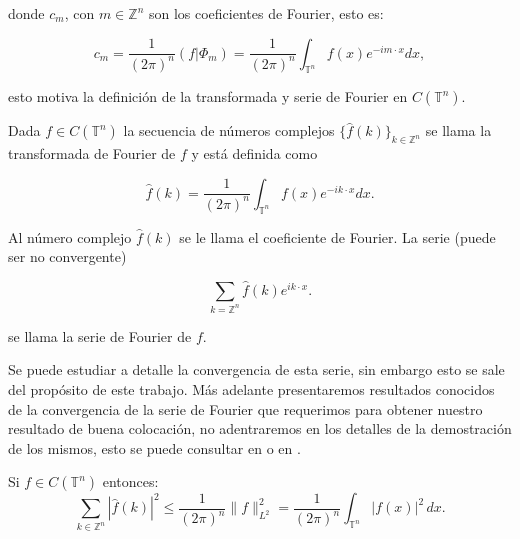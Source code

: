 \documentclass[12pt]{article}
\newcommand\Z{\ensuremath{\mathbb{Z}}}
\newcommand\T{\mathbb{T}}
\begin{document}
donde $c_m$, con $m\in \Z^n$ son los coeficientes de Fourier, esto es:

$$c_m=\dfrac{1}{(2\pi)^n}\left(f|\Phi_m\right)=\dfrac{1}{(2\pi)^n}\int_{\T^n}f(x)e^{-im\cdot x} dx,$$

esto motiva la definición de la transformada y serie de Fourier en $C(\T^n)$.


\begin{definition}
Dada $f \in C(\T^n)$ la secuencia de números complejos $\{\widehat{f}(k)\}_{k \in \mathbb{Z}^n}$ se llama la transformada de Fourier de $f$ y está definida como

$$
\widehat{f}(k)=\frac{1}{(2 \pi)^n} \int_{\T^n} f(x) e^{-i k \cdot x} d x.
$$


Al número complejo $\widehat{f}(k)$ se le llama el coeficiente de Fourier.
La serie (puede ser no convergente)

$$
\sum_{k=\Z^n} \widehat{f}(k) e^{i k \cdot x}.
$$

se llama la serie de Fourier de $f$.
\end{definition}

Se puede estudiar a detalle la convergencia de esta serie, sin embargo esto se sale del propósito de este trabajo. Más adelante presentaremos resultados conocidos de la convergencia de la serie de Fourier que requerimos para obtener nuestro resultado de buena colocación, no adentraremos en los detalles de la demostración de los mismos, esto se puede consultar en \cite{grafakos2008classical} o en \cite{iorio2001fourier}.

\begin{theorem}\label{bessel}
Si $f \in C (\T^{n})$ entonces:
$$\sum_{k \in \mathbb{Z}^n} | \hat{f}(k) |^2 \leq \frac{1}{(2\pi)^n} \| f \|_{L^2}^2 = \frac{1}{(2\pi)^n} \int_{\T^n} |f(x)|^2 \, dx.$$
\end{theorem}
\end{document}
